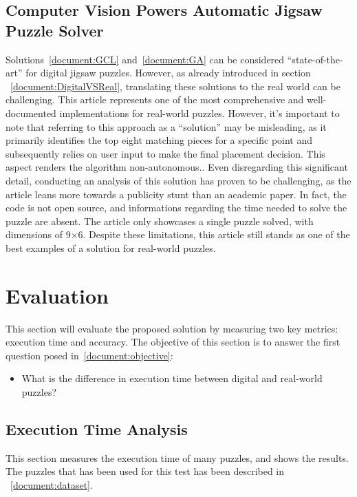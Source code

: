 \documentclass[epsfig,a4paper,11pt,titlepage,twoside,openany]{article}
\begin{document}
\subsection{Computer Vision Powers Automatic Jigsaw Puzzle Solver~\cite{Abto}}
Solutions~\cref{document:GCL} and~\cref{document:GA} can be considered ``state-of-the-art''
for digital jigsaw puzzles.
However, as already introduced in section ~\cref{document:DigitalVSReal},
translating these solutions to the real world can be challenging.\newline
This article represents one of the most comprehensive and well-documented
implementations for real-world puzzles. However,
it's important to note that referring to this approach as a ``solution''
may be misleading, as it primarily identifies the top eight matching
pieces for a specific point and subsequently relies on user input to make
the final placement decision.
This aspect renders the algorithm non-autonomous..\newline
Even disregarding this significant detail,
conducting an analysis of this solution has proven to be challenging,
as the article leans more towards a publicity stunt than an academic paper.
In fact, the code is not open source, and informations regarding the time needed
to solve the puzzle are absent. The article only showcases a single puzzle solved,
with dimensions of 9\(\times\)6.\newline
Despite these limitations, this article still stands as one of the best examples of a solution
for real-world puzzles.



\cleardoublepage
\section{Evaluation}
This section will evaluate the proposed solution by measuring
two key metrics: execution time and accuracy. 
The objective of this section is to answer the first question posed in~\cref{document:objective}:
\begin{itemize}
  \item What is the difference in execution time between
                digital and real-world puzzles?
\end{itemize}

\subsection{Execution Time Analysis}

This section measures the execution time of many puzzles,
and shows the results. The puzzles that has been used for
this test has been described in ~\cref{document:dataset}.
\end{document}
